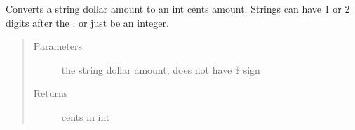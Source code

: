 \documentclass[letterpaper,10pt,english]{sphinxmanual}
\begin{document}

\begin{fulllineitems}
\label{\detokenize{apidoc/utdesign_procurement:utdesign_procurement.utils.lenientConvertToCents}}
Converts a string dollar amount to an int cents amount.
Strings can have 1 or 2 digits after the . or just be an integer.
\begin{quote}\begin{description}
\item[{Parameters}] \leavevmode
{} \textendash{} the string dollar amount, does not have \$ sign

\item[{Returns}] \leavevmode
cents in int

\end{description}\end{quote}

\end{fulllineitems}

\end{document}
